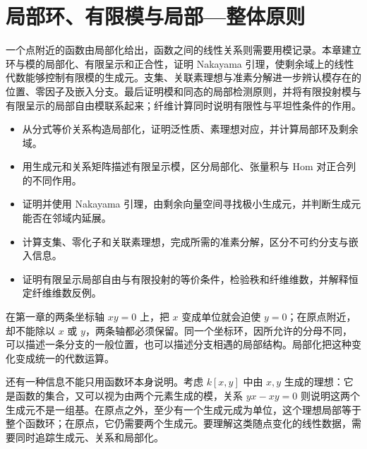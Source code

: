 
% 
% 

\chapter{局部环、有限模与局部—整体原则}
\label{g5:ch:02}

\begin{chapterabstract}
	一个点附近的函数由局部化给出，函数之间的线性关系则需要用模记录。本章建立环与模的局部化、有限呈示和正合性，证明 Nakayama 引理，使剩余域上的线性代数能够控制有限模的生成元。支集、关联素理想与准素分解进一步辨认模存在的位置、零因子及嵌入分支。最后证明模和同态的局部检测原则，并将有限投射模与有限呈示的局部自由模联系起来；纤维计算同时说明有限性与平坦性条件的作用。
\end{chapterabstract}

\begin{learninggoals}
	\begin{itemize}
		\item 从分式等价关系构造局部化，证明泛性质、素理想对应，并计算局部环及剩余域。
		\item 用生成元和关系矩阵描述有限呈示模，区分局部化、张量积与 Hom 对正合列的不同作用。
		\item 证明并使用 Nakayama 引理，由剩余向量空间寻找极小生成元，并判断生成元能否在邻域内延展。
		\item 计算支集、零化子和关联素理想，完成所需的准素分解，区分不可约分支与嵌入信息。
		\item 证明有限呈示局部自由与有限投射的等价条件，检验秩和纤维维数，并解释恒定纤维维数反例。
	\end{itemize}
\end{learninggoals}

在第一章的两条坐标轴 \(xy=0\) 上，把 \(x\) 变成单位就会迫使 \(y=0\)；在原点附近，却不能除以 \(x\) 或 \(y\)，两条轴都必须保留。同一个坐标环，因所允许的分母不同，可以描述一条分支的一般位置，也可以描述分支相遇的局部结构。局部化把这种变化变成统一的代数运算。

\ProseParagraphBreak

还有一种信息不能只用函数环本身说明。考虑 \(k[x,y]\) 中由 \(x,y\) 生成的理想：它是函数的集合，又可以视为由两个元素生成的模，关系 \(yx-xy=0\) 则说明这两个生成元不是一组基。在原点之外，至少有一个生成元成为单位，这个理想局部等于整个函数环；在原点，它仍需要两个生成元。要理解这类随点变化的线性数据，需要同时追踪生成元、关系和局部化。

